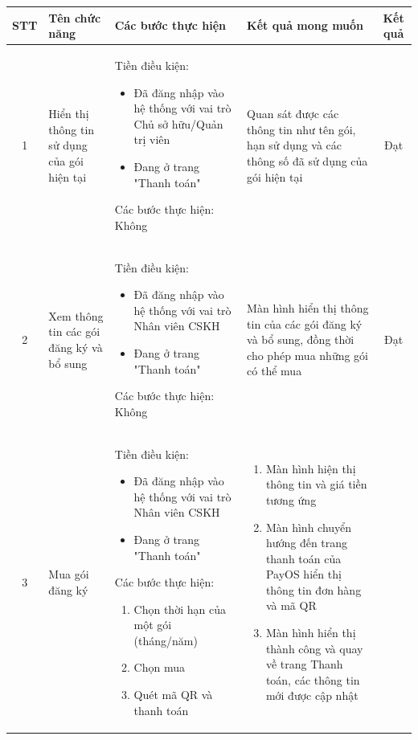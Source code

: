 \newpage
\begin{longtable}{|c|m{2.5cm}|m{5.5cm}|m{4.5cm}|c|}
    \hline
    \textbf{STT} & \textbf{Tên chức năng} & \textbf{Các bước thực hiện} & \textbf{Kết quả mong muốn} & \textbf{Kết quả} \\
    \hline
    1 & 
    Hiển thị thông tin sử dụng của gói hiện tại & 
    Tiền điều kiện:
    \begin{itemize}
        \item Đã đăng nhập vào hệ thống với vai trò Chủ sở hữu/Quản trị viên
        \item Đang ở trang "Thanh toán"
    \end{itemize}
    Các bước thực hiện: Không
    & 
    Quan sát được các thông tin như tên gói, hạn sử dụng và các thông số đã sử dụng của gói hiện tại& Đạt \\
    \hline
    2 & 
    Xem thông tin các gói đăng ký và bổ sung& 
    Tiền điều kiện:
    \begin{itemize}
        \item Đã đăng nhập vào hệ thống với vai trò Nhân viên CSKH
        \item Đang ở trang "Thanh toán"
    \end{itemize}
    Các bước thực hiện: Không
    & 
        Màn hình hiển thị thông tin của các gói đăng ký và bổ sung, đồng thời cho phép mua những gói có thể mua
     & Đạt \\
    \hline
    3 & 
    Mua gói đăng ký& 
    Tiền điều kiện:
    \begin{itemize}
        \item Đã đăng nhập vào hệ thống với vai trò Nhân viên CSKH
        \item Đang ở trang "Thanh toán"
    \end{itemize}
    Các bước thực hiện: 
    \begin{enumerate}[label=\arabic*.]
        \item Chọn thời hạn của một gói (tháng/năm)
        \item Chọn mua
        \item Quét mã QR và thanh toán
    \end{enumerate}
    & 
    \begin{enumerate}[label=\arabic*.]
        \item Màn hình hiện thị thông tin và giá tiền tương ứng
        \item Màn hình chuyển hướng đến trang thanh toán của PayOS hiển thị thông tin đơn hàng và mã QR
        \item Màn hình hiển thị thành công và quay về trang Thanh toán, các thông tin mới được cập nhật

\end{enumerate}
\end{longtable}
